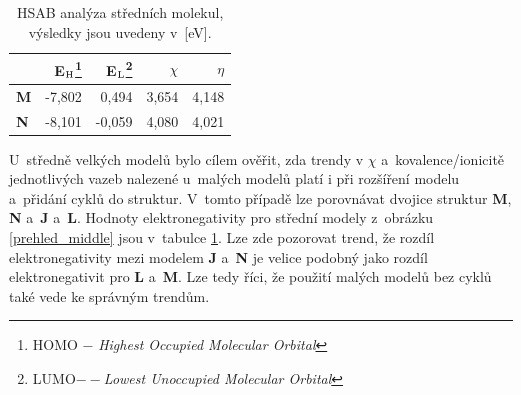 \documentclass[
digital, %
table,   %
nolof,     %
nolot,     %
oneside,
]{fithesis3}
\begin{document}
\begin{table}[H]
\begin{minipage}{\textwidth}
\caption{HSAB analýza středních molekul, výsledky jsou uvedeny v~[eV].}
\begin{center}
\begin{tabular}{|l|r|r|r|r|}
\hline
\label{hsab_middle}& E$_{\ce{H}}$\footnote{HOMO $-$ \textit{Highest Occupied Molecular Orbital}}  & E$_{\ce{L}}$\footnote{LUMO$ -- $\textit{Lowest Unoccupied Molecular Orbital}} & $\chi$  & $\eta$ \\ \hline
\textbf{M} & -7,802 & 0,494 & 3,654 & 4,148 \\ \hline
\textbf{N} & -8,101 & -0,059 & 4,080 & 4,021 \\ \hline
\end{tabular}
\end{center}
\end{minipage}
\end{table}

U~středně velkých modelů bylo cílem ověřit, zda trendy v $\chi$ a~kovalence/ionicitě jednotlivých vazeb nalezené u~malých modelů platí i při rozšíření modelu a~přidání cyklů do struktur. V~tomto případě lze porovnávat dvojice struktur \textbf{M}, \textbf{N} a~\textbf{J} a~\textbf{L}. Hodnoty elektronegativity pro střední modely z~obrázku \ref{prehled_middle} jsou v~tabulce \ref{hsab_middle}. Lze zde pozorovat trend, že rozdíl elektronegativity mezi modelem \textbf{J} a~\textbf{N} je velice podobný jako rozdíl elektronegativit pro \textbf{L} a~\textbf{M}. Lze tedy říci, že použití malých modelů bez cyklů také vede ke správným trendům.
\end{document}
